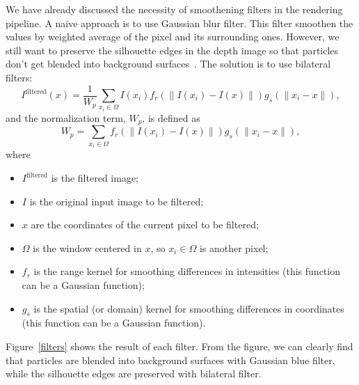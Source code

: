 \documentclass[sigconf]{acmart}
\begin{document}
We have already discussed the necessity of smoothening filters in the rendering pipeline. A naive approach is to use Gaussian blur filter. This filter smoothen the values by weighted average of the pixel and its surrounding ones. However, we still want to preserve the silhouette edges in the depth image so that particles don't get blended into background surfaces~\cite{screennvidia}. The solution is to use bilateral filters:
\begin{equation}
  I^\text{filtered}(x) = \frac{1}{W_p} \sum_{x_i \in \Omega} I(x_i)f_r(\|I(x_i) - I(x)\|)g_s(\|x_i - x\|),
\end{equation}
and the normalization term, $W_{p}$, is defined as
\begin{equation}
  W_p = \sum_{x_i \in \Omega}{f_r(\|I(x_i) - I(x)\|)g_s(\|x_i - x\|)},
\end{equation}
where
\begin{itemize}
  \item ${I^{\text{filtered}}}$ is the filtered image;
  \item $I$ is the original input image to be filtered;
  \item $x$ are the coordinates of the current pixel to be filtered;
  \item $\Omega$ is the window centered in $x$, so $x_{i}\in \Omega$ is another pixel;
  \item $f_{r}$ is the range kernel for smoothing differences in intensities (this function can be a Gaussian function);
  \item $g_{s}$ is the spatial (or domain) kernel for smoothing differences in coordinates (this function can be a Gaussian function).
\end{itemize}

Figure~\ref{filters} shows the result of each filter. From the figure, we can clearly find that particles are blended into background surfaces with Gaussian blue filter, while the silhouette edges are preserved with bilateral filter.
\end{document}
